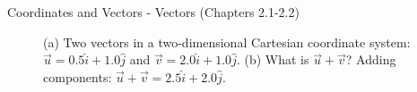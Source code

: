 \documentclass{beamer}
\begin{document}
\begin{frame}{Coordinates and Vectors - Vectors (Chapters 2.1-2.2)}
\begin{figure}
\centering
{}
\caption{\label{fig:twovectors} (a) Two vectors in a two-dimensional Cartesian coordinate system: $\vec{u} = 0.5\hat{i}+1.0\hat{j}$ and $\vec{v} = 2.0\hat{i}+1.0\hat{j}$.  (b) What is $\vec{u}+\vec{v}$?  Adding components: $\vec{u}+\vec{v} = 2.5\hat{i}+2.0\hat{j}$.}
\end{figure}
\end{frame}
\end{document}
